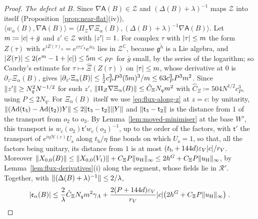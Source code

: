 \documentclass[11pt]{preprint}
\DeclarePairedDelimiter{\abs}{\lvert}{\rvert}
\DeclarePairedDelimiter{\norm}{\lVert}{\rVert}
\numberwithin{equation}{section}
\theoremstyle{definition}
\theoremstyle{remark}
\theoremstyle{plain}
\begin{document}
\begin{proof}
\emph{The defect at $B$.} Since $\nabla\mathsf A(B) \in \mathcal Z$ and $(\Delta(B) + \lambda)^{-1}$ maps $\mathcal Z$ into itself (Proposition~\ref{prop:near-flat}(iv)), $\langle w_\alpha(B), \nabla\mathsf A(B)\rangle = \langle\Pi_{\mathcal Z}\nabla\Xi_\alpha(B), (\Delta(B) + \lambda)^{-1}\nabla\mathsf A(B)\rangle$. Let $m \coloneqq \abs c + \bar g$ and $z' \in \mathcal Z$ with $\abs{z'} = 1$. For complex $\tau$ with $\abs\tau \leq m$ the form $Z(\tau)$ with $e^{iZ(\tau)_b} = e^{i\tau z'_b}e^{ic_b}$ lies in $\mathcal Z^{\mathbb C}$, because $\mathfrak g^{\tilde h}$ is a Lie algebra, and $\abs{Z(\tau)} \leq 2(e^m - 1 + \abs c) \leq 5m < \rho_P$ for $\bar g$ small, by the series of the logarithm; so Cauchy's estimate for $\tau \mapsto \hat\Xi(Z(\tau))$ on $\abs\tau \leq m$, whose derivative at $0$ is $\partial_{z'}\Xi_\alpha(B)$, gives $\abs{\partial_{z'}\Xi_\alpha(B)} \leq \frac12c_P^3P^3(5m)^3/m \leq 63c_P^3P^3m^2$. Since $\norm{z'} \geq N_q^2N^{-1/2}$ for such $z'$, $\norm{\Pi_{\mathcal Z}\nabla\Xi_\alpha(B)} \leq \hat C_\Xi N_qm^2$ with $\hat C_\Xi \coloneqq 504N^{1/2}c_P^3$, using $P \leq 2N_q$. For $\Xi_\alpha(B)$ itself we use \eqref{eq:flux-along-z} at $z = c$: by unitarity, $\norm{(\mathrm{Ad}(\mathsf t_3) - \mathrm{Ad}(\mathsf t_2))Y} \leq 2\norm{\mathsf t_3 - \mathsf t_2}\norm Y$ and $\norm{\mathsf t_3 - \mathsf t_2}$ is the distance from $1$ of the transport from $o_2$ to $o_3$. By Lemma~\ref{lem:moved-minimiser} at the base $W'$, this transport is $w_c(o_2)\mathsf t'w_c(o_3)^{-1}$, up to the order of the factors, with $\mathsf t'$ the transport of $e^{i\eta\mathcal H(c)}U_{\mathrm s}$ along $t_{\mathrm b}/\eta$ fine bonds on which $U_{\mathrm s} = 1$, so that, all the factors being unitary, its distance from $1$ is at most $(t_{\mathrm b} + 144d)\varepsilon_V\abs c/r_V$. Moreover $\norm{X_{0,0}(B)} \leq \norm{X_{0,0}(V_1)} + C_\Xi P\norm{u_{\mathrm H}}_\infty \leq 2h^G + C_\Xi P\norm{u_{\mathrm H}}_\infty$, by Lemma~\ref{lem:flux-derivatives}(i) along the segment, whose fields lie in $\mathcal R'$. Together, with $\norm{(\Delta(B) + \lambda)^{-1}} \leq 2/\lambda$,
\begin{equation}\label{eq:defect-background}
    \abs{\mathfrak e_\alpha(B)} \leq \frac2\lambda\hat C_\Xi N_qm^2\gamma_A + \frac{2(P + 144d)\varepsilon_V}{r_V}\abs c\bigl(2h^G + C_\Xi P\norm{u_{\mathrm H}}_\infty\bigr)\;.
\end{equation}


\end{proof}
\end{document}
